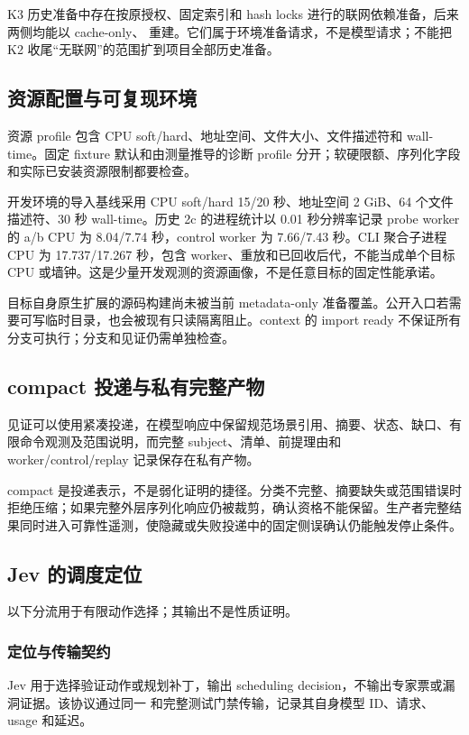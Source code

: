 K3 历史准备中存在按原授权、固定索引和 hash locks 进行的联网依赖准备，后来两侧均能以 cache-only、 重建。它们属于环境准备请求，不是模型请求；不能把 K2 收尾“无联网”的范围扩到项目全部历史准备。\cite{k3}

\subsection{资源配置与可复现环境}
资源 profile 包含 CPU soft/hard、地址空间、文件大小、文件描述符和 wall-time。固定 fixture 默认和由测量推导的诊断 profile 分开；软硬限额、序列化字段和实际已安装资源限制都要检查。

开发环境的导入基线采用 CPU soft/hard 15/20 秒、地址空间 2 GiB、64 个文件描述符、30 秒 wall-time。历史 2c 的进程统计以 0.01 秒分辨率记录 probe worker 的 a/b CPU 为 8.04/7.74 秒，control worker 为 7.66/7.43 秒。CLI 聚合子进程 CPU 为 17.737/17.267 秒，包含 worker、重放和已回收后代，不能当成单个目标 CPU 或墙钟。这是少量开发观测的资源画像，不是任意目标的固定性能承诺。\citep{stage2c,k3}

目标自身原生扩展的源码构建尚未被当前 metadata-only 准备覆盖。公开入口若需要可写临时目录，也会被现有只读隔离阻止。context 的 import ready 不保证所有分支可执行；分支和见证仍需单独检查。

\subsection{compact 投递与私有完整产物}
见证可以使用紧凑投递，在模型响应中保留规范场景引用、摘要、状态、缺口、有限命令观测及范围说明，而完整 subject、清单、前提理由和 worker/control/replay 记录保存在私有产物。

compact 是投递表示，不是弱化证明的捷径。分类不完整、摘要缺失或范围错误时拒绝压缩；如果完整外层序列化响应仍被裁剪，确认资格不能保留。生产者完整结果同时进入可靠性遥测，使隐藏或失败投递中的固定侧误确认仍能触发停止条件。

\subsection{Jev 的调度定位}
以下分流用于有限动作选择；其输出不是性质证明。
\subsubsection{定位与传输契约}
Jev 用于选择验证动作或规划补丁，输出 scheduling decision，不输出专家票或漏洞证据。该协议通过同一  和完整测试门禁传输，记录其自身模型 ID、请求、usage 和延迟。

